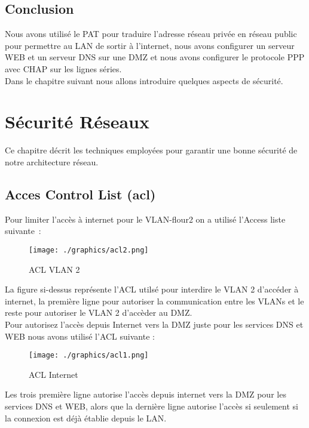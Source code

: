\documentclass[12pt,a4paper]{report}
\begin{document}
		\section{Conclusion}
		Nous avons utilisé le PAT pour traduire l’adresse réseau privée en réseau public pour permettre au LAN de sortir à l'internet, nous avons configurer un serveur WEB et un serveur DNS sur une DMZ et nous avons configurer le protocole PPP avec CHAP sur les lignes séries.\\
		Dans le chapitre suivant nous allons introduire quelques aspects de sécurité.

		\chapter{Sécurité Réseaux}
		Ce chapitre décrit les techniques employées pour garantir une bonne sécurité de notre architecture réseau.

		\section{Acces Control List (\ac{acl}) }
		Pour limiter l’accès à internet pour le VLAN-flour2 on a utilisé l’Access liste suivante : \\
		\begin{figure}[!hbtp]
			\centering
			\texttt{[image: ./graphics/acl2.png]}
			\caption{ACL VLAN 2}
		\end{figure}
		\newline
		La figure si-dessus représente l'ACL utilsé pour interdire le VLAN 2 d'accéder à internet, la première ligne pour autoriser la communication entre les VLANs et le reste pour autoriser le VLAN 2 d'accèder au DMZ.\\
		\newline
		Pour autorisez l’accès depuis Internet vers la DMZ juste pour les services DNS et WEB nous avons utilisé l'ACL suivante : \\
		\newline
		\begin{figure}[!hbtp]
			\centering
			\texttt{[image: ./graphics/acl1.png]}
			\caption{ACL Internet}
		\end{figure}
		
		\newpage
		Les trois première ligne autorise l'accès depuis internet vers la DMZ pour les services DNS et WEB, alors que la dernière ligne autorise l'accès si seulement si la connexion est déjà établie depuis le LAN.
\end{document}
